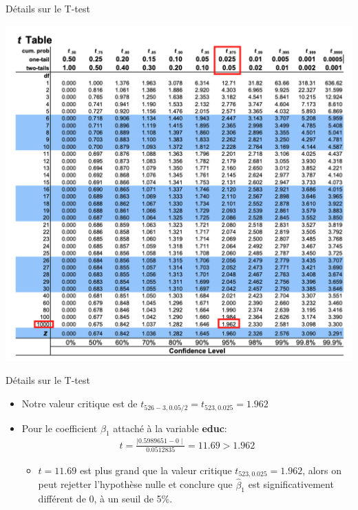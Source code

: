 \documentclass{beamer}
\begin{document}
\begin{frame}{Détails sur le T-test}
\begin{center}
\includegraphics[scale=.4]{tstat}
\end{center}
\end{frame}

\begin{frame}{Détails sur le T-test}
\begin{itemize}
\item Notre valeur critique est de $t_{526-3,0.05/2}=t_{523,0.025}=1.962$
\item Pour le coefficient $\beta_1$ attaché à la variable \textbf{educ}:
\begin{align*}
t=\frac{\mid 0.5989651-0 \mid}{0.0512835} = 11.69 > 1.962
\end{align*}
\begin{itemize}
\item $t=11.69$ est plus grand que la valeur critique $t_{523,0.025}=1.962$, alors on peut rejetter l'hypothèse nulle et conclure que $\hat{\beta}_1$ est significativement différent de 0, à un seuil de 5\%.
\end{itemize}
\end{itemize}
\end{frame}
\end{document}
